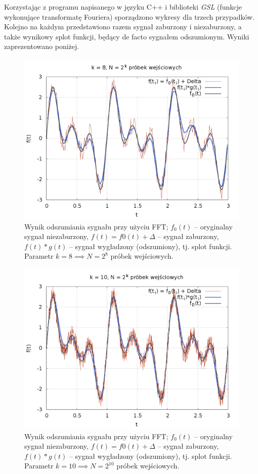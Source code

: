 Korzystając z programu napisanego w języku C++ i biblioteki \textit{GSL} (funkcje wykonujące transformatę Fouriera) sporządzono wykresy dla trzech przypadków. Kolejno na każdym przedstawiono razem sygnał zaburzony i niezaburzony, a także wynikowy splot funkcji, będący de facto sygnałem odszumionym. Wyniki zaprezentowano poniżej.
\begin{figure}[h!]
	\begin{center}
		\includegraphics[height=0.41\linewidth]{k8.png}
	\caption{Wynik  odszumiania  sygnału  przy  użyciu  FFT; $  f_0(t) $ – oryginalny  sygnał  niezaburzony, $ f(t) = f0(t) + \Delta $ – sygnał zaburzony, $ f(t)\ast g(t) $ – sygnał wygładzony (odszumiony), tj. splot funkcji. Parametr $k = 8\implies N = 2^{8}$ próbek wejściowych.}
	\label{k8} 
	\end{center}
\end{figure}
\begin{figure}[h!]
	\begin{center}
	\includegraphics[height=0.41\linewidth]{k10.png}
	\caption{Wynik  odszumiania  sygnału  przy  użyciu  FFT; $  f_0(t) $ – oryginalny  sygnał  niezaburzony, $ f(t) = f0(t) + \Delta $ – sygnał zaburzony, $ f(t)\ast g(t) $ – sygnał wygładzony (odszumiony), tj. splot funkcji. Parametr $k = 10\implies N = 2^{10}$ próbek wejściowych.}
	\label{k10} 
\end{center}
\end{figure}
